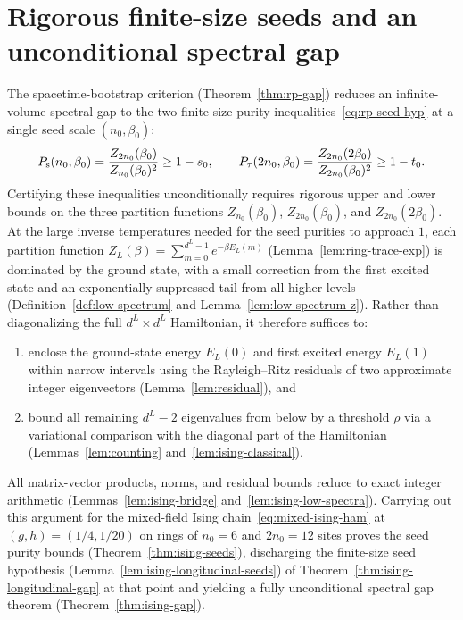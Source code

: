 \chapter{Rigorous finite-size seeds and an unconditional spectral gap}
\label{chap:seedkernel}

The spacetime-bootstrap criterion (Theorem~\ref{thm:rp-gap}) reduces an infinite-volume spectral
gap to the two finite-size purity inequalities~\eqref{eq:rp-seed-hyp} at a single seed scale
\((n_0, \beta_0)\):
\[
  P_{\mathrm{s}}(n_0, \beta_0) = \frac{Z_{2n_0}(\beta_0)}{Z_{n_0}(\beta_0)^2} \ge 1 - s_0, \qquad
  P_{\tau}(2n_0, \beta_0) = \frac{Z_{2n_0}(2\beta_0)}{Z_{2n_0}(\beta_0)^2} \ge 1 - t_0.
\]
Certifying these inequalities unconditionally requires rigorous upper and lower bounds on the three
partition functions \(Z_{n_0}(\beta_0)\), \(Z_{2n_0}(\beta_0)\), and \(Z_{2n_0}(2\beta_0)\). At the
large inverse temperatures needed for the seed purities to approach \(1\), each partition function
\(Z_L(\beta) = \sum_{m=0}^{d^L-1} e^{-\beta E_L(m)}\) (Lemma~\ref{lem:ring-trace-exp}) is dominated
by the ground state, with a small correction from the first excited state and an exponentially
suppressed tail from all higher levels (Definition~\ref{def:low-spectrum} and
Lemma~\ref{lem:low-spectrum-z}). Rather than diagonalizing the full \(d^L \times d^L\) Hamiltonian,
it therefore suffices to:
\begin{enumerate}
  \item enclose the ground-state energy \(E_L(0)\) and first excited energy \(E_L(1)\) within narrow
  intervals using the Rayleigh--Ritz residuals of two approximate integer eigenvectors
  (Lemma~\ref{lem:residual}), and
  \item bound all remaining \(d^L - 2\) eigenvalues from below by a threshold \(\rho\) via a
  variational comparison with the diagonal part of the Hamiltonian (Lemmas~\ref{lem:counting}
  and~\ref{lem:ising-classical}).
\end{enumerate}
All matrix-vector products, norms, and residual bounds reduce to exact integer arithmetic
(Lemmas~\ref{lem:ising-bridge} and~\ref{lem:ising-low-spectra}). Carrying out this argument for the
mixed-field Ising chain~\eqref{eq:mixed-ising-ham} at \((g, h) = (1/4, 1/20)\) on rings of
\(n_0 = 6\) and \(2n_0 = 12\) sites proves the seed purity bounds (Theorem~\ref{thm:ising-seeds}),
discharging the finite-size seed hypothesis (Lemma~\ref{lem:ising-longitudinal-seeds}) of
Theorem~\ref{thm:ising-longitudinal-gap} at that point and yielding a fully unconditional spectral
gap theorem (Theorem~\ref{thm:ising-gap}).


